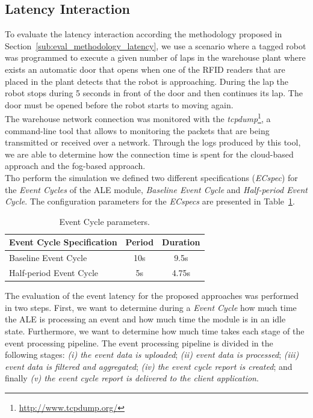 \subsection{Latency Interaction}
\label{sub:eval_exp_latency}
To evaluate the latency interaction according the methodology proposed in Section~\ref{sub:eval_methodology_latency},
we use a scenario where a tagged robot was programmed to execute a given number of laps in the
warehouse plant where exists an automatic door that opens when one of the \gls{RFID} readers
that are placed in the plant detects that the robot is approaching. During the lap the robot stops during 5 seconds
in front of the door and then continues its lap. The door must be opened before the robot starts
to moving again.\\

The warehouse network connection was monitored with the \textit{tcpdump}\footnote{\url{http://www.tcpdump.org/}},
a command-line tool that allows to monitoring the packets that are being transmitted or received over
a network. Through the logs produced by this tool, we are able to determine how the connection time
is spent for the cloud-based approach and the fog-based approach.\\

Tho perform the simulation we defined two different specifications (\textit{ECspec}) for the
\textit{Event Cycles} of the \gls{ALE} module, \textit{Baseline Event Cycle} and
\textit{Half-period Event Cycle}. The configuration parameters for the \textit{ECspecs} are presented
in Table~\ref{table:ecspec_parameters}.

\begin{table}[ht!]
 \begin{tabular}{|l|c|c|}
  \hline
  Event Cycle Specification & Period  & Duration \\ \hline
  Baseline Event Cycle      &  10s    & 9.5s     \\ \hline
  Half-period Event Cycle   &   5s    & 4.75s    \\ \hline
 \end{tabular}
 \caption[Event Cycle parameters.]{Event Cycle parameters.}
 \label{table:ecspec_parameters}
\end{table}

The evaluation of the event latency for the proposed approaches was performed in two steps. First,
we want to determine during a \textit{Event Cycle} how much time the \gls{ALE} is processing an event
and how much time the module is in an idle state. Furthermore, we want to determine how much time
takes each stage of the event processing pipeline. The event processing pipeline is divided in the
following stages: \textit{(i) the event data is uploaded}; \textit{(ii) event data is processed};
\textit{(iii) event data is filtered and aggregated}; \textit{(iv) the event cycle report is created};
and finally \textit{(v) the event cycle report is delivered to the client application}.

